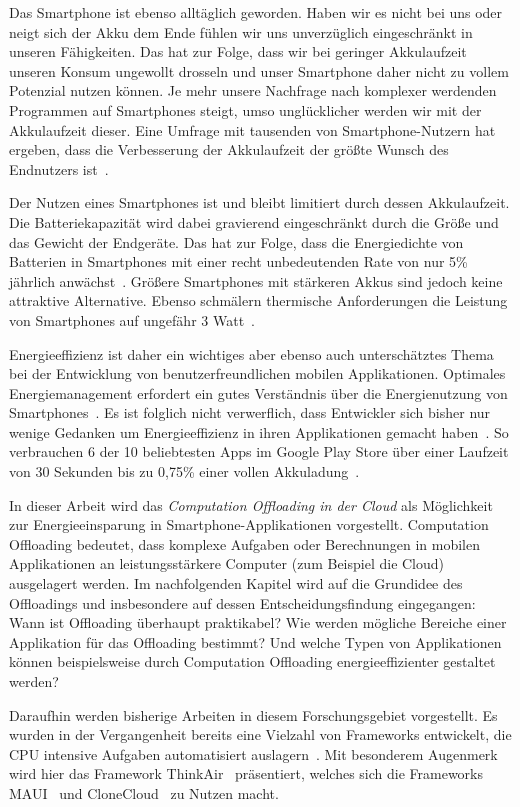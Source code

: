 \documentclass{sigchi}
\begin{document}
Das Smartphone ist ebenso alltäglich geworden. Haben wir es nicht bei uns oder neigt sich der Akku dem Ende fühlen wir uns unverzüglich eingeschränkt in unseren Fähigkeiten.
Das hat zur Folge, dass wir bei geringer Akkulaufzeit unseren Konsum ungewollt drosseln und unser Smartphone daher nicht zu vollem Potenzial nutzen können.
Je mehr unsere Nachfrage nach komplexer werdenden Programmen auf Smartphones steigt, umso unglücklicher werden wir mit der Akkulaufzeit dieser.
Eine Umfrage mit tausenden von Smartphone-Nutzern hat ergeben, dass die Verbesserung der Akkulaufzeit der größte Wunsch des Endnutzers ist~\cite{o13-6}.

Der Nutzen eines Smartphones ist und bleibt limitiert durch dessen Akkulaufzeit.
Die Batteriekapazität wird dabei gravierend eingeschränkt durch die Größe und das Gewicht der Endgeräte.
Das hat zur Folge, dass die Energiedichte von Batterien in Smartphones mit einer recht unbedeutenden Rate von nur 5\% jährlich anwächst~\cite{o12-8}. 
Größere Smartphones mit stärkeren Akkus sind jedoch keine attraktive Alternative.
Ebenso schmälern thermische Anforderungen die Leistung von Smartphones auf ungefähr 3 Watt~\cite{o12-5}.

Energieeffizienz ist daher ein wichtiges aber ebenso auch unterschätztes Thema bei der Entwicklung von benutzerfreundlichen mobilen Applikationen.
Optimales Energiemanagement erfordert ein gutes Verständnis über die Energienutzung von Smartphones~\cite{e1}.
Es ist folglich nicht verwerflich, dass Entwickler sich bisher nur wenige Gedanken um Energieeffizienz in ihren Applikationen gemacht haben~\cite{e3}.
So verbrauchen 6 der 10 beliebtesten Apps im Google Play Store über einer Laufzeit von 30 Sekunden bis zu 0,75\% einer vollen Akkuladung~\cite{e3}.

In dieser Arbeit wird das \emph{Computation Offloading in der Cloud} als Möglichkeit zur Energieeinsparung in Smartphone-Applikationen vorgestellt.
Computation Offloading bedeutet, dass komplexe Aufgaben oder Berechnungen in mobilen Applikationen an leistungsstärkere Computer (zum Beispiel die Cloud) ausgelagert werden.
Im nachfolgenden Kapitel wird auf die Grundidee des Offloadings und insbesondere auf dessen Entscheidungsfindung eingegangen:
Wann ist Offloading überhaupt praktikabel?
Wie werden mögliche Bereiche einer Applikation für das Offloading bestimmt?
Und welche Typen von Applikationen können beispielsweise durch Computation Offloading energieeffizienter gestaltet werden?

Daraufhin werden bisherige Arbeiten in diesem Forschungsgebiet vorgestellt.
Es wurden in der Vergangenheit bereits eine Vielzahl von Frameworks entwickelt, die CPU intensive Aufgaben automatisiert auslagern~\cite{thinkair, maui, clonecloud, cuckoo, moca, smartdiet}.
Mit besonderem Augenmerk wird hier das Framework ThinkAir~\cite{thinkair} präsentiert, welches sich die Frameworks MAUI~\cite{maui} und CloneCloud~\cite{clonecloud} zu Nutzen macht.
\end{document}
